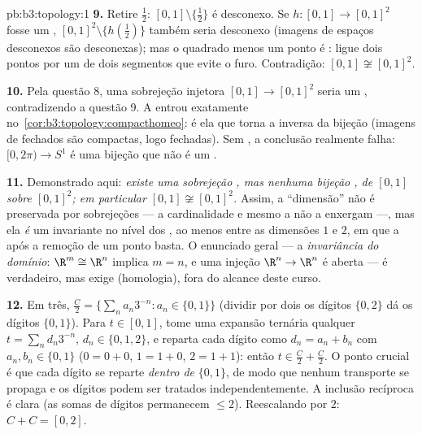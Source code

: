 \begin{solution}{pb:b3:topology:1}
\textbf{9.} Retire $\frac12$: $[0,1]\setminus\{\frac12\}$ é
desconexo. Se $h \colon [0,1] \to [0,1]^2$ fosse um
, $[0,1]^2\setminus\{h(\frac12)\}$ também seria
desconexo (imagens  de espaços desconexos
são desconexas); mas o quadrado menos um ponto é
: ligue dois pontos por um  de dois segmentos que evite
o furo. Contradição: $[0,1] \not\cong [0,1]^2$.

\textbf{10.} Pela questão 8, uma sobrejeção  injetora
$[0,1] \to [0,1]^2$ seria um , contradizendo a
questão 9. A  entrou exatamente no~\cref{cor:b3:topology:compacthomeo}: é ela que torna  a inversa da
bijeção  (imagens de fechados são compactas, logo
fechadas). Sem , a conclusão realmente falha: $[0, 2\pi) \to S^1$ é uma bijeção 
que não é um .

\textbf{11.} Demonstrado aqui: \emph{existe uma sobrejeção
, mas nenhuma bijeção , de $[0,1]$ sobre
$[0,1]^2$; em particular $[0,1] \not\cong [0,1]^2$.} Assim,
a ``dimensão'' não é preservada por sobrejeções  ---
a cardinalidade e mesmo a  não a enxergam ---, mas ela
\emph{é} um invariante  no nível dos
, ao menos entre as dimensões $1$ e $2$, em que a
 após a remoção de um ponto basta. O enunciado geral
--- a \emph{invariância do domínio}: $\R^m \cong \R^n$ implica $m =
n$, e uma injeção  $\R^n \to \R^n$ é aberta ---
é verdadeiro, mas exige   (homologia), fora do
alcance deste curso.

\textbf{12.} Em  três, $\frac C2 = \{\sum_na_n3^{-n} : a_n
\in \{0, 1\}\}$ (dividir por dois os dígitos $\{0,2\}$ dá os dígitos
$\{0,1\}$). Para $t \in [0,1]$, tome uma expansão ternária qualquer $t =
\sum_nd_n3^{-n}$, $d_n \in \{0,1,2\}$, e reparta cada dígito
como $d_n = a_n + b_n$ com $a_n, b_n \in \{0,1\}$ ($0 = 0{+}0$,
$1 = 1{+}0$, $2 = 1{+}1$): então $t \in \frac C2 + \frac C2$.
O ponto crucial é que cada dígito se reparte \emph{dentro de} $\{0,1\}$, de modo que
nenhum transporte se propaga e os dígitos podem ser tratados
independentemente. A inclusão recíproca é clara (as somas de dígitos permanecem
$\leq 2$). Reescalando por $2$: $C + C = [0,2]$.


\end{solution}
